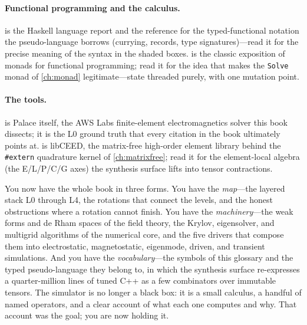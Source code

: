 \paragraph{Functional programming and the calculus.}
\citet{peytonjones2003} is the Haskell language report and the reference for the
typed-functional notation the pseudo-language borrows (currying, records, type
signatures)---read it for the precise meaning of the syntax in the shaded
boxes. \citet{wadler1995monads} is the classic exposition of monads for
functional programming; read it for the idea that makes the \texttt{Solve} monad
of \cref{ch:monad} legitimate---state threaded purely, with one mutation point.

\paragraph{The tools.}
\citet{palace2023} is Palace itself, the AWS Labs finite-element electromagnetics
solver this book dissects; it is the L0 ground truth that every citation in the
book ultimately points at. \citet{ceed2021} is libCEED, the matrix-free
high-order element library behind the \texttt{\#extern} quadrature kernel of
\cref{ch:matrixfree}; read it for the element-local algebra (the E/L/P/C/G axes)
the synthesis surface lifts into tensor contractions.

\summarysection
You now have the whole book in three forms. You have the \emph{map}---the
layered stack L0 through L4, the rotations that connect the levels, and the
honest obstructions where a rotation cannot finish. You have the
\emph{machinery}---the weak forms and de Rham spaces of the field theory, the
Krylov, eigensolver, and multigrid algorithms of the numerical core, and the
five drivers that compose them into electrostatic, magnetostatic, eigenmode,
driven, and transient simulations. And you have the \emph{vocabulary}---the
symbols of this glossary and the typed pseudo-language they belong to, in which
the synthesis surface re-expresses a quarter-million lines of tuned C++ as a few
combinators over immutable tensors. The simulator is no longer a black box: it is
a small calculus, a handful of named operators, and a clear account of what each
one computes and why. That account was the goal; you are now holding it.
